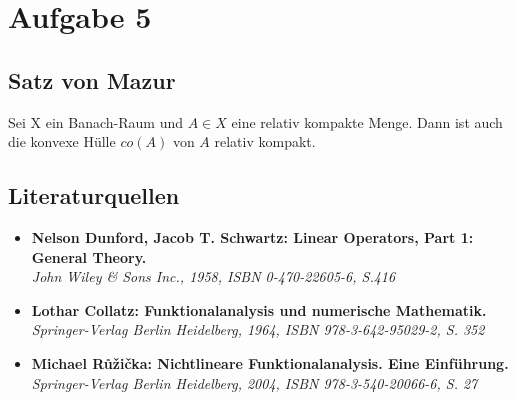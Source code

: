 \documentclass[a4paper,fontsize=8pt,DIV=1]{article}
\theoremstyle{plain}
\begin{document}



\section*{Aufgabe 5}
\subsection*{Satz von Mazur}
Sei X ein Banach-Raum und $A \in X$ eine relativ kompakte Menge. Dann ist auch die konvexe Hülle $co(A)$ von $A$ relativ kompakt.

\subsection*{Literaturquellen}
\begin{itemize}
	\item \textbf{Nelson Dunford, Jacob T. Schwartz: Linear Operators, Part 1: General Theory.}\\
	\textit{John Wiley \& Sons Inc., 1958, ISBN 0-470-22605-6, S.416}
	\item \textbf{Lothar Collatz: Funktionalanalysis und numerische Mathematik.}\\
	\textit{Springer-Verlag Berlin Heidelberg, 1964, ISBN 978-3-642-95029-2, S. 352}
	\item \textbf{Michael Růžička: Nichtlineare Funktionalanalysis. Eine Einführung.}\\
	\textit{Springer-Verlag Berlin Heidelberg, 2004, ISBN 978-3-540-20066-6, S. 27}
\end{itemize}
\end{document}

